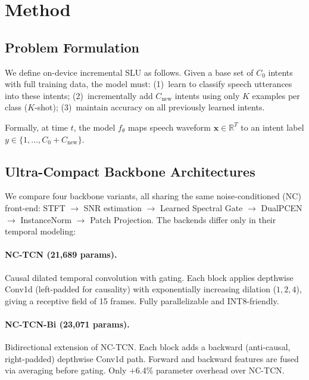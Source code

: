 \documentclass[11pt]{article}
\begin{document}
\section{Method}

\subsection{Problem Formulation}

We define on-device incremental SLU as follows.
Given a base set of $C_0$ intents with full training data, the model must:
(1)~learn to classify speech utterances into these intents;
(2)~incrementally add $C_{\text{new}}$ intents using only $K$ examples per class ($K$-shot);
(3)~maintain accuracy on all previously learned intents.

Formally, at time $t$, the model $f_\theta$ maps speech waveform $\mathbf{x} \in \mathbb{R}^{T}$ to an intent label $y \in \{1, \ldots, C_0 + C_{\text{new}}\}$.

\subsection{Ultra-Compact Backbone Architectures}

We compare four backbone variants, all sharing the same noise-conditioned (NC) front-end: STFT $\rightarrow$ SNR estimation $\rightarrow$ Learned Spectral Gate $\rightarrow$ DualPCEN $\rightarrow$ InstanceNorm $\rightarrow$ Patch Projection.
The backends differ only in their temporal modeling:

\paragraph{NC-TCN (21,689 params).}
Causal dilated temporal convolution with gating.
Each block applies depthwise Conv1d (left-padded for causality) with exponentially increasing dilation ($1, 2, 4$), giving a receptive field of 15 frames.
Fully parallelizable and INT8-friendly.

\paragraph{NC-TCN-Bi (23,071 params).}
Bidirectional extension of NC-TCN.
Each block adds a backward (anti-causal, right-padded) depthwise Conv1d path.
Forward and backward features are fused via averaging before gating.
Only $+$6.4\% parameter overhead over NC-TCN.
\end{document}

